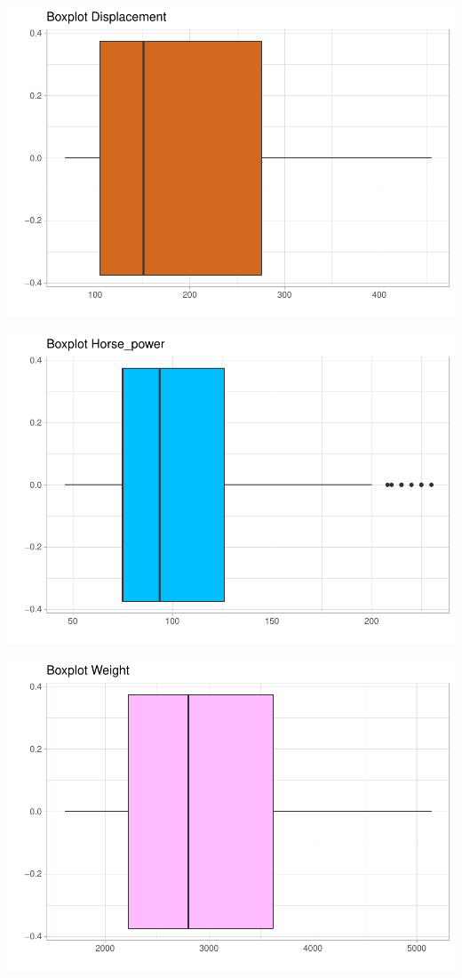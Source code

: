 \documentclass[
]{article}
\begin{document}
\begin{center}\includegraphics{EDA_files/figure-latex/unnamed-chunk-8-1} \end{center}

\begin{center}\includegraphics{EDA_files/figure-latex/unnamed-chunk-8-2} \end{center}

\begin{center}\includegraphics{EDA_files/figure-latex/unnamed-chunk-8-3} \end{center}
\end{document}
